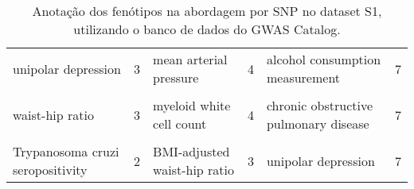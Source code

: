 \begin{landscape}
\begin{table}[hp]
{\begin{tabular}[t]{lrlrlr}
unipolar depression & 3 & mean arterial pressure & 4 & alcohol consumption measurement & 7\\
\cellcolor{gray!6}{vital capacity} & \cellcolor{gray!6}{3} & \cellcolor{gray!6}{monocyte percentage of leukocytes} & \cellcolor{gray!6}{4} & \cellcolor{gray!6}{bipolar disorder} & \cellcolor{gray!6}{7}\\
waist-hip ratio & 3 & myeloid white cell count & 4 & chronic obstructive pulmonary disease & 7\\
\cellcolor{gray!6}{Alzheimer's disease} & \cellcolor{gray!6}{2} & \cellcolor{gray!6}{reticulocyte count} & \cellcolor{gray!6}{4} & \cellcolor{gray!6}{response to bronchodilator} & \cellcolor{gray!6}{7}\\
Trypanosoma cruzi seropositivity & 2 & BMI-adjusted waist-hip ratio & 3 & unipolar depression & 7\\
\bottomrule

\end{tabular}}

\caption{Anotação dos fenótipos na abordagem por SNP no dataset S1, utilizando o banco de dados do GWAS Catalog.}
\label{tab:ds1_gwas_persnp}

\end{table}
\end{landscape}

